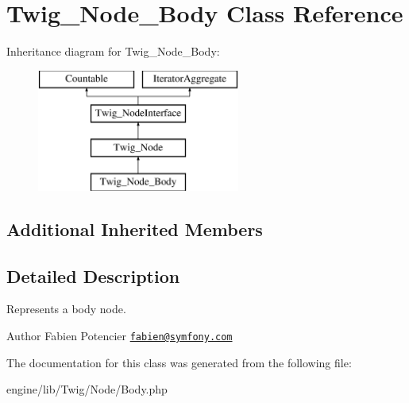 \hypertarget{class_twig___node___body}{}\section{Twig\+\_\+\+Node\+\_\+\+Body Class Reference}
\label{class_twig___node___body}
Inheritance diagram for Twig\+\_\+\+Node\+\_\+\+Body\+:\begin{figure}[H]
\begin{center}
\leavevmode
\includegraphics[height=4.000000cm]{class_twig___node___body}
\end{center}
\end{figure}
\subsection*{Additional Inherited Members}


\subsection{Detailed Description}
Represents a body node.

\begin{DoxyAuthor}{Author}
Fabien Potencier \href{mailto:fabien@symfony.com}{\tt fabien@symfony.\+com} 
\end{DoxyAuthor}


The documentation for this class was generated from the following file\+:\begin{DoxyCompactItemize}
\item 
engine/lib/\+Twig/\+Node/Body.\+php\end{DoxyCompactItemize}
